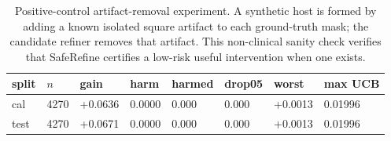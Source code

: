 \begin{table}[t]
\centering
\small
\caption{Positive-control artifact-removal experiment. A synthetic host is formed by adding a known isolated square artifact to each ground-truth mask; the candidate refiner removes that artifact. This non-clinical sanity check verifies that SafeRefine certifies a low-risk useful intervention when one exists.}
\label{tab:positive_control}
\begin{tabular}{llllllll}
\toprule
split & $n$ & gain & harm & harmed & drop05 & worst & max UCB \\
\midrule
cal & 4270 & +0.0636 & 0.0000 & 0.000 & 0.000 & +0.0013 & 0.01996 \\
test & 4270 & +0.0671 & 0.0000 & 0.000 & 0.000 & +0.0013 & 0.01996 \\
\bottomrule
\end{tabular}
\end{table}

